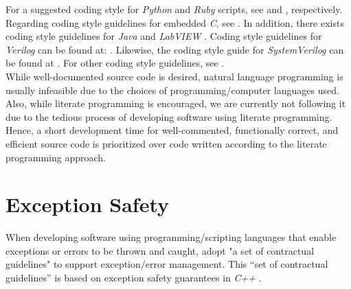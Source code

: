 \documentclass[letter,12pt]{article}
\begin{document}
For a suggested coding style for {\it Python} and {\it Ruby} scripts, see \cite{vanRossum2013} and \cite{Macdonald20XY}, respectively. Regarding coding style guidelines for embedded {\it C}, see \cite{Barr2013,Labrosse1999}. In addition, there exists coding style guidelines for {\it Java} \cite{OracleCorporationStaff20XYa,Smith2003,OracleCorporationStaff2016b,OracleCorporationStaff2016,OracleCorporationStaff20XY,Long1995,Carrano2012} and {\it LabVIEW} \cite{Blume2007a,Conway2003}. Coding style guidelines for {\it Verilog} can be found at: \cite{Bening2001,Bening2000}. Likewise, the coding style guide for {\it SystemVerilog} can be found at \cite{Mintz2007}. For other coding style guidelines, see \cite{Wolf20XY,Cady2017,IntelCorporationStaff2015,Schneider2013a,Weatherwax2008,Laplante2012,McConnell2004,Feathers2005,Koopman2010,Valvano2007,Fingeroff2010,Shore2008,Schach2007,Kernighan1982}. \\




While well-documented source code is desired, natural language programming \cite{WikipediaContributors2016i} is usually infeasible due to the choices of programming/computer languages used. Also, while literate programming \cite{Knuth1984,Knuth1992a,McConnell2004,Subramaniam2006,Schach2007,Oram2007,MullerHannemann2010}
 is encouraged, we are currently not following it due to the tedious process of developing software using literate programming. Hence, a short development time for well-commented, functionally correct, and efficient source code is prioritized over code written according to the literate programming approach.


\section{Exception Safety}
\label{sec:ExceptionSafety}

When developing software using programming/scripting languages that enable exceptions or errors to be thrown and caught, adopt "a set of contractual guidelines" \cite{WikipediaContributors2016f} to support exception/error management. This ``set of contractual guidelines'' is based on exception safety guarantees in {\it C++} \cite{Abrahams1998,Abrahams2001,WikipediaContributors2016f} \cite[Subsection \S4.4 on ``Writing exception safe code'']{WikibooksContributors2016}. \\
\end{document}
